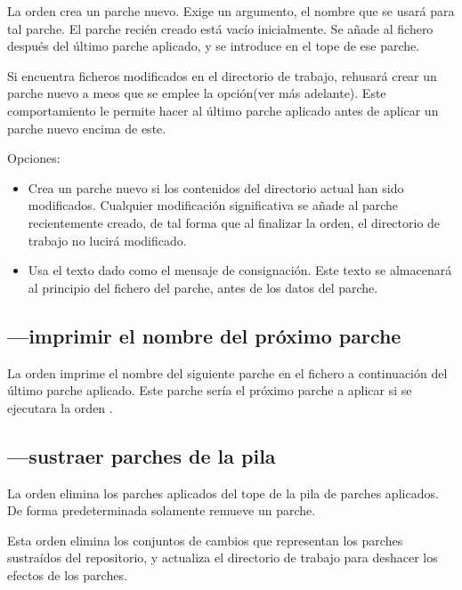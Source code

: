 La orden  crea un parche nuevo.  Exige un argumento,
el nombre que se usará para tal parche.  El parche recién creado está
vacío inicialmente.   Se añade al fichero  después
del último parche aplicado, y se introduce en el tope de ese parche.

Si  encuentra ficheros modificados en el directorio
de trabajo, rehusará crear un parche nuevo a meos que se emplee
 la opción(ver más adelante).  Este
comportamiento le permite hacer  al último parche
aplicado antes de aplicar un parche nuevo encima de este.

Opciones:
\begin{itemize}
\item[\hgxopt{mq}{qnew}{-f}] Crea un parche nuevo si los contenidos
  del directorio actual han sido modificados.  Cualquier modificación
  significativa se añade al parche recientemente creado,  de tal forma
  que al finalizar la orden, el directorio de trabajo no lucirá
  modificado.
\item[\hgxopt{mq}{qnew}{-m}] Usa el texto dado como el mensaje de
  consignación.  Este texto se almacenará al principio del fichero del
  parche, antes de los datos del parche.
\end{itemize}

\subsection{---imprimir el nombre del próximo parche}

La orden  imprime el nombre del siguiente parche en
el fichero  a continuación del último parche
aplicado.  Este parche sería el próximo parche a aplicar si se
ejecutara la orden .

\subsection{---sustraer parches de la pila}

La orden  elimina los parches aplicados del tope de
la pila de parches aplicados.  De forma predeterminada solamente
remueve un parche.

Esta orden elimina los conjuntos de cambios que representan los
parches sustraídos del repositorio, y actualiza el directorio de
trabajo para deshacer los efectos de los parches.

